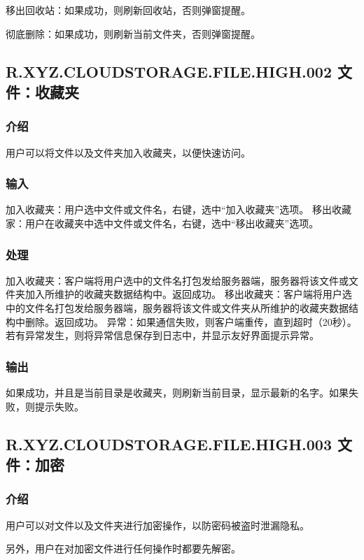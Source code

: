 移出回收站：如果成功，则刷新回收站，否则弹窗提醒。

彻底删除：如果成功，则刷新当前文件夹，否则弹窗提醒。

\subsection{R.XYZ.CLOUDSTORAGE.FILE.HIGH.002 文件：收藏夹}

\subsubsection{介绍} 
用户可以将文件以及文件夹加入收藏夹，以便快速访问。

\subsubsection{输入} 
加入收藏夹：用户选中文件或文件名，右键，选中“加入收藏夹”选项。
移出收藏家：用户在收藏夹中选中文件或文件名，右键，选中“移出收藏夹”选项。

\subsubsection{处理}
加入收藏夹：客户端将用户选中的文件名打包发给服务器端，服务器将该文件或文件夹加入所维护的收藏夹数据结构中。返回成功。
移出收藏夹：客户端将用户选中的文件名打包发给服务器端，服务器将该文件或文件夹从所维护的收藏夹数据结构中删除。返回成功。
异常：如果通信失败，则客户端重传，直到超时（20秒）。
若有异常发生，则将异常信息保存到日志中，并显示友好界面提示异常。

\subsubsection{输出}
如果成功，并且是当前目录是收藏夹，则刷新当前目录，显示最新的名字。如果失败，则提示失败。

\subsection{R.XYZ.CLOUDSTORAGE.FILE.HIGH.003 文件：加密}

\subsubsection{介绍}
用户可以对文件以及文件夹进行加密操作，以防密码被盗时泄漏隐私。 

另外，用户在对加密文件进行任何操作时都要先解密。

